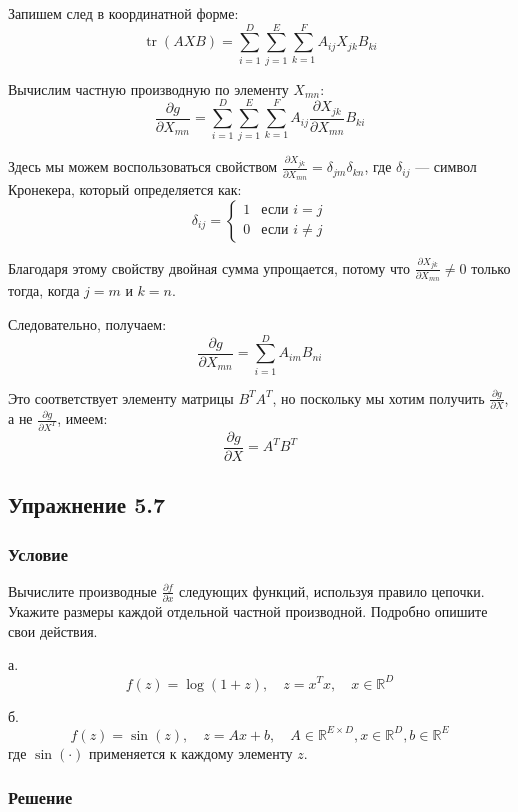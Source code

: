 \documentclass{article}
\begin{document}
\quad

Запишем след в координатной форме:
\[
\operatorname{tr}(AXB) = \sum_{i=1}^D \sum_{j=1}^E \sum_{k=1}^F A_{ij} X_{jk} B_{ki}
\]

Вычислим частную производную по элементу \( X_{mn} \):
\[
\frac{\partial g}{\partial X_{mn}} = \sum_{i=1}^D \sum_{j=1}^E \sum_{k=1}^F A_{ij} \frac{\partial X_{jk}}{\partial X_{mn}} B_{ki}
\]

Здесь мы можем воспользоваться свойством \( \frac{\partial X_{jk}}{\partial X_{mn}} = \delta_{jm} \delta_{kn} \), где \( \delta_{ij} \) — символ Кронекера, который определяется как:
\[
\delta_{ij} = \begin{cases}
1 & \text{если } i = j \\
0 & \text{если } i \neq j
\end{cases}
\]

Благодаря этому свойству двойная сумма упрощается, потому что \( \frac{\partial X_{jk}}{\partial X_{mn}} \neq 0 \) только тогда, когда \( j = m \) и \( k = n \).

Следовательно, получаем:
\[
\frac{\partial g}{\partial X_{mn}} = \sum_{i=1}^D A_{im} B_{ni}
\]

Это соответствует элементу матрицы \( B^T A^T \), но поскольку мы хотим получить \( \frac{\partial g}{\partial X} \), а не \( \frac{\partial g}{\partial X^T} \), имеем:
\[
\frac{\partial g}{\partial X} = A^T B^T
\]

\subsection*{Упражнение 5.7}

\subsubsection*{Условие}

Вычислите производные \( \frac{\partial f}{\partial x} \) следующих функций, используя правило цепочки. Укажите размеры каждой отдельной частной производной. Подробно опишите свои действия.

\quad

а.
\[
f(z) = \log(1 + z), \quad z = x^T x, \quad x \in \mathbb{R}^D
\]

\quad

б.
\[
f(z) = \sin(z), \quad z = Ax + b, \quad A \in \mathbb{R}^{E \times D}, x \in \mathbb{R}^D, b \in \mathbb{R}^E
\]
где \(\sin(\cdot)\) применяется к каждому элементу \(z\).

\subsubsection*{Решение}
\end{document}

